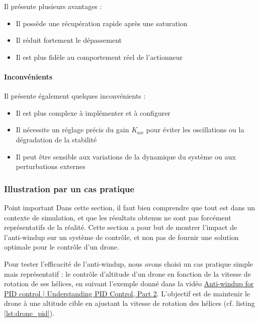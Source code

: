 Il présente plusieurs avantages :
\begin{itemize}
    \item Il possède une récupération rapide après une saturation
    \item Il réduit fortement le dépassement
    \item Il est plus fidèle au comportement réel de l'actionneur
\end{itemize}

\paragraph{Inconvénients}

Il présente également quelques inconvénients :
\begin{itemize}
    \item Il est plus complexe à implémenter et à configurer
    \item Il nécessite un réglage précis du gain $K_{aw}$ pour éviter les oscillations ou la dégradation de la stabilité
    \item Il peut être sensible aux variations de la dynamique du système ou aux perturbations externes
\end{itemize}

\subsubsection{Illustration par un cas pratique}
\label{sec:illustration_drone}

\RemarkBox
{Point important}
{
Dans cette section, il faut bien comprendre que tout est dans un contexte de simulation, et que les résultats obtenus ne sont pas forcément représentatifs de la réalité. Cette section a pour but de montrer l'impact de l'anti-windup sur un système de contrôle, et non pas de fournir une solution optimale pour le contrôle d'un drone.
}

Pour tester l'efficacité de l'anti-windup, nous avons choisi un cas pratique simple mais représentatif : le contrôle d'altitude d'un drone en fonction de la vitesse de rotation de ses hélices, en suivant l'exemple donné dans la vidéo \href{https://www.youtube.com/watch?v=NVLXCwc8HzM&list=PLn8PRpmsu08pQBgjxYFXSsODEF3Jqmm-y&index=24}{Anti-windup for PID control | Understanding PID Control, Part 2}. L'objectif est de maintenir le drone à une altitude cible en ajustant la vitesse de rotation des hélices (cf. listing \ref{lst:drone_pid}). \\

